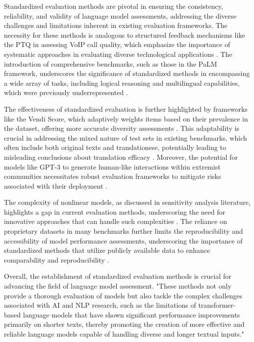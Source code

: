 Standardized evaluation methods are pivotal in ensuring the consistency, reliability, and validity of language model assessments, addressing the diverse challenges and limitations inherent in existing evaluation frameworks. The necessity for these methods is analogous to structured feedback mechanisms like the PTQ in assessing VoIP call quality, which emphasize the importance of systematic approaches in evaluating diverse technological applications \cite{gupchup2018analysisproblemtokensrank}. The introduction of comprehensive benchmarks, such as those in the PaLM framework, underscores the significance of standardized methods in encompassing a wide array of tasks, including logical reasoning and multilingual capabilities, which were previously underrepresented \cite{chowdhery2023palm}.



The effectiveness of standardized evaluation is further highlighted by frameworks like the Vendi Score, which adaptively weights items based on their prevalence in the dataset, offering more accurate diversity assessments \cite{pasarkar2024cousinsvendiscorefamily}. This adaptability is crucial in addressing the mixed nature of test sets in existing benchmarks, which often include both original texts and translationese, potentially leading to misleading conclusions about translation efficacy \cite{bogoychev2020domaintranslationesenoisesynthetic}. Moreover, the potential for models like GPT-3 to generate human-like interactions within extremist communities necessitates robust evaluation frameworks to mitigate risks associated with their deployment \cite{mcguffie2020radicalizationrisksgpt3advanced}.



The complexity of nonlinear models, as discussed in sensitivity analysis literature, highlights a gap in current evaluation methods, underscoring the need for innovative approaches that can handle such complexities \cite{dimov2017multidimensionalsensitivityanalysislargescale}. The reliance on proprietary datasets in many benchmarks further limits the reproducibility and accessibility of model performance assessments, underscoring the importance of standardized methods that utilize publicly available data to enhance comparability and reproducibility \cite{touvron2023llama}.



Overall, the establishment of standardized evaluation methods is crucial for advancing the field of language model assessment. "These methods not only provide a thorough evaluation of models but also tackle the complex challenges associated with AI and NLP research, such as the limitations of transformer-based language models that have shown significant performance improvements primarily on shorter texts, thereby promoting the creation of more effective and reliable language models capable of handling diverse and longer textual inputs." \cite{ginzburg2021selfsuperviseddocumentsimilarityranking}











